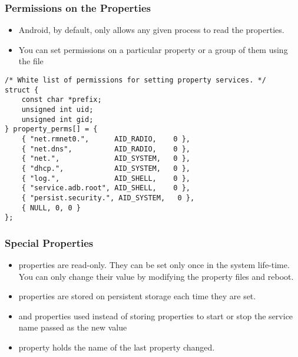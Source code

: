 \begin{frame}[fragile]
  \frametitle{Permissions on the Properties}
  \begin{itemize}
  \item Android, by default, only allows any given process to read the
    properties.
  \item You can set permissions on a particular property or a group of
    them using the file 
  \end{itemize}
\begin{verbatim}
/* White list of permissions for setting property services. */
struct {
    const char *prefix;
    unsigned int uid;
    unsigned int gid;
} property_perms[] = {
    { "net.rmnet0.",      AID_RADIO,    0 },
    { "net.dns",          AID_RADIO,    0 },
    { "net.",             AID_SYSTEM,   0 },
    { "dhcp.",            AID_SYSTEM,   0 },
    { "log.",             AID_SHELL,    0 },
    { "service.adb.root", AID_SHELL,    0 },
    { "persist.security.", AID_SYSTEM,   0 },
    { NULL, 0, 0 }
};
\end{verbatim}
\end{frame}

\begin{frame}
  \frametitle{Special Properties}
  \begin{itemize}
  \item {} properties are read-only. They can be set only
    once in the system life-time. You can only change their value by
    modifying the property files and reboot.
  \item {} properties are stored on persistent storage
    each time they are set.
  \item {} and  properties used instead
    of storing properties to start or stop the service name passed as
    the new value
  \item {} property holds the name of the last
     property changed.
  \end{itemize}
\end{frame}

